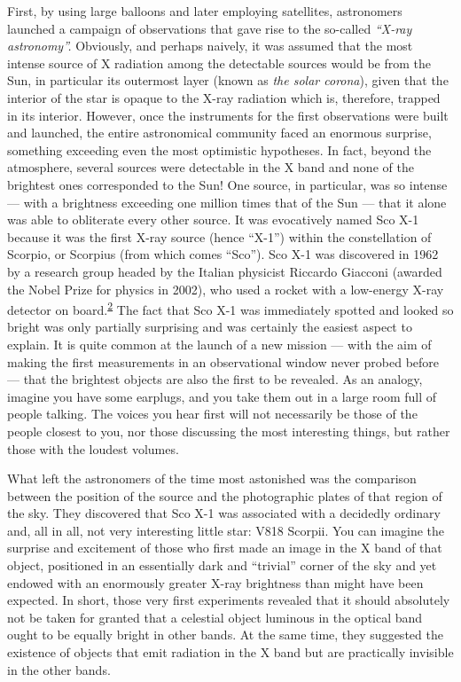 First, by using large balloons and later employing satellites, astronomers launched a
campaign of observations that gave rise to the so-called
\emph{``X-ray} \emph{astronomy''.} Obviously, and perhaps naively, it
was assumed that the most intense source of X radiation among the detectable sources
would be from the Sun, in particular its outermost layer (known as \emph{the solar
corona}), given that the interior of the star is opaque to the X-ray
radiation which is, therefore, trapped in its interior. However, once the instruments
for the first observations were built and launched, the entire astronomical community
faced an enormous surprise, something exceeding even the most optimistic hypotheses. In
fact, beyond the atmosphere, several sources were detectable in the X band and none of
the brightest ones corresponded to the Sun! One source, in particular, was so intense
--- with a brightness exceeding one million times that of the Sun --- that it alone was
able to obliterate every other source. It was evocatively named Sco
X-1 because it was the first X-ray source (hence
``X-1'') within the constellation of Scorpio, or Scorpius (from which comes ``Sco'').
Sco X-1 was discovered in 1962 by a research group headed by the
Italian physicist Riccardo Giacconi (awarded the Nobel Prize for
physics in 2002), who used a rocket with a low-energy X-ray detector
on board.\textsuperscript{\hyperlink{note:05-02}{2}} The fact that Sco X-1 was immediately
spotted and looked so bright was only partially surprising and was certainly the easiest
aspect to explain. It is quite common at the launch of a new mission --- with the aim of
making the first measurements in an observational window never probed before --- that
the brightest objects are also the first to be revealed. As an analogy, imagine you have
some earplugs, and you take them out in a large room full of people talking. The voices
you hear first will not necessarily be those of the people closest to you, nor those
discussing the most interesting things, but rather those with the loudest volumes.

What left the astronomers of the time most astonished was the comparison between the
position of the source and the photographic plates of that region of the sky. They
discovered that Sco X-1 was associated with a decidedly ordinary and,
all in all, not very interesting little star: V818 Scorpii. You can imagine the surprise
and excitement of those who first made an image in the X band of that object, positioned
in an essentially dark and ``trivial'' corner of the sky and yet endowed with an
enormously greater X-ray brightness than might have been expected. In
short, those very first experiments revealed that it should absolutely not be taken for
granted that a celestial object luminous in the optical band ought to be equally bright
in other bands. At the same time, they suggested the existence of objects that emit
radiation in the X band but are practically invisible in the other bands.

